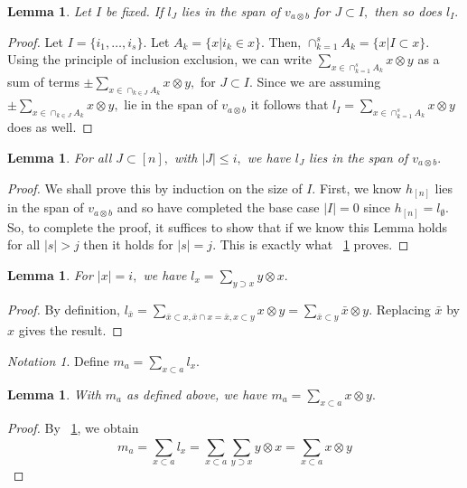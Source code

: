 \documentclass{amsart}
\newtheorem{lem}[thm]{Lemma}
\theoremstyle{remark}
\newtheorem{note}[thm]{Notation}
\begin{document}
\begin{lem}
\label{l_induction_step}
Let $I$ be fixed. If $l_J$ lies in the span of $v_{a\otimes b}$ for $J \subset I,$ then so does $l_I.$

\end{lem}
\begin{proof}
Let $I = \{i_1,\ldots, i_s\}.$ Let $A_k = \{x | i_k \in x\}.$ Then, $\cap_{k=1}^s A_k = \{x | I \subset x\}.$ Using the principle of inclusion exclusion, we can write $\sum_{x \in\cap_{k=1}^s A_k} x\otimes y$ as a sum of terms $\pm \sum_{x \in\cap_{k \in J} A_k} x\otimes y,$ for $J \subset I.$ Since we are assuming $\pm \sum_{x \in\cap_{k \in J} A_k} x\otimes y,$ lie in the span of $v_{a\otimes b}$ it follows that $l_I = \sum_{x \in\cap_{k=1}^s A_k} x\otimes y$ does as well.

\end{proof}

\begin{lem}
For all $J \subset [n],$ with $|J| \leq i,$ we have $l_{J}$ lies in the span of $v_{a \otimes b}.$ 
\end{lem}
\begin{proof}
We shall prove this by induction on the size of $I.$ First, we know $h_{[n]}$ lies in the span of $v_{a\otimes b}$ and so have completed the base case $|I| = 0$ since $h_{[n]} = l_{\emptyset}.$ So, to complete the proof, it suffices to show that if we know this Lemma holds for all $|s|>j$ then it holds for $|s| = j.$  This is exactly what ~\ref{l_induction_step} proves.
\end{proof}

\begin{lem}
\label{l_diag_equivalence}
For $|x| = i,$ we have $l_{x} = \sum_{y \supset x}^{}y\otimes x.$
\end{lem}
\begin{proof}
By definition, $l_{\bar x} = \sum_{\bar x\subset x,\bar x \cap x = \bar x,x\subset y}^{}x\otimes y = \sum_{\bar x\subset y}^{}\bar x\otimes y.$ Replacing $\bar x$ by $x$ gives the result.
\end{proof}

\begin{note}
Define $m_a = \sum_{x \subset a}^{}l_{x}.$
\end{note}

\begin{lem}
\label{m_equivalence}
With $m_a$ as defined above, we have $m_a = \sum_{x\subset a}^{}x\otimes y.$
\end{lem}
\begin{proof}
By ~\ref{l_diag_equivalence}, we obtain
$$m_a = \sum_{x \subset a}^{}l_{x} = \sum_{x \subset a}^{}\sum_{y \supset x}^{}y\otimes x= \sum_{x\subset a}^{}x\otimes y$$
\end{proof}
\end{document}
